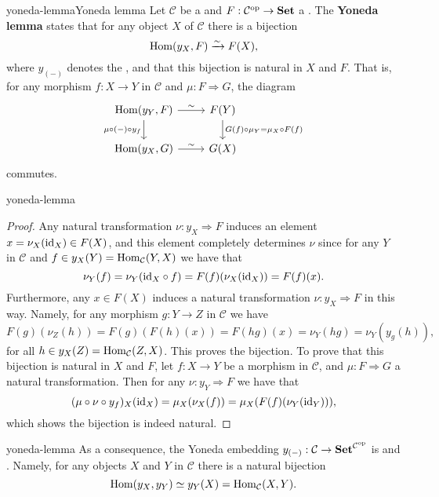\begin{topic}{yoneda-lemma}{Yoneda lemma}
    Let $\mathcal{C}$ be a  and $F : \mathcal{C}^\textup{op} \to \textbf{Set}$ a . The \textbf{Yoneda lemma} states that for any object $X$ of $\mathcal{C}$ there is a bijection
    \[ \operatorname{Hom}(y_X, F) \xrightarrow{\sim} F(X) , \]
    where $y_{(-)}$ denotes the , and that this bijection is natural in $X$ and $F$. That is, for any morphism $f : X \to Y$ in $\mathcal{C}$ and  $\mu : F \Rightarrow G$, the diagram
    \[ \begin{tikzcd} \Hom(y_Y, F) \arrow{r}{\sim} \arrow[swap]{d}{\mu \circ (-) \circ y_f} & F(Y) \arrow{d}{G(f) \circ \mu_Y = \mu_X \circ F(f)} \\ \Hom(y_X, G) \arrow{r}{\sim} & G(X) \end{tikzcd} \]
    commutes.
\end{topic}

\begin{example}{yoneda-lemma}
    \begin{proof}
        Any natural transformation $\nu : y_X \Rightarrow F$ induces an element $x = \nu_X(\textup{id}_X) \in F(X)$, and this element completely determines $\nu$ since for any $Y$ in $\mathcal{C}$ and $f \in y_X(Y) = \operatorname{Hom}_\mathcal{C}(Y, X)$ we have that
        \[ \nu_{Y}(f) = \nu_{Y}(\textup{id}_X \circ f) = F(f)(\nu_X(\textup{id}_X)) = F(f)(x) . \]
        Furthermore, any $x \in F(X)$ induces a natural transformation $\nu : y_X \Rightarrow F$ in this way. Namely, for any morphism $g : Y \to Z$ in $\mathcal{C}$ we have
        \[ F(g)(\nu_Z(h)) = F(g)(F(h)(x)) = F(hg)(x) = \nu_Y(hg) = \nu_Y(y_g(h)) , \]
        for all $h \in y_X(Z) = \operatorname{Hom}_\mathcal{C}(Z, X)$. This proves the bijection. To prove that this bijection is natural in $X$ and $F$, let $f : X \to Y$ be a morphism in $\mathcal{C}$, and $\mu : F \Rightarrow G$ a natural transformation. Then for any $\nu : y_Y \Rightarrow F$ we have that
        \[ (\mu \circ \nu \circ y_f)_X(\textup{id}_X) = \mu_X(\nu_X(f)) = \mu_X(F(f)(\nu_Y(\textup{id}_Y))) , \]
        which shows the bijection is indeed natural.
    \end{proof}
\end{example}

\begin{example}{yoneda-lemma}
    As a consequence, the Yoneda embedding $y_{(-)} : \mathcal{C} \to \textbf{Set}^{\mathcal{C}^\textup{op}}$ is  and . Namely, for any objects $X$ and $Y$ in $\mathcal{C}$ there is a natural bijection
    \[ \operatorname{Hom}(y_X, y_Y) \simeq y_Y(X) = \operatorname{Hom}_\mathcal{C}(X, Y) . \]
\end{example}

